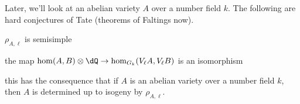 Later, we'll look at an abelian variety $A$ over a number field $k$. The following 
are hard conjectures of Tate (theorems of Faltings now). 

$\rho_{A,\ell}$ is semisimple 

the map $\hom(A,B)\otimes\dQ \to \hom_{G_k}(V_\ell A,V_\ell B)$ is an isomorphism 

this has the consequence that if $A$ is an abelian variety over a number field 
$k$, then $A$ is determined up to isogeny by $\rho_{A,\ell}$. 

